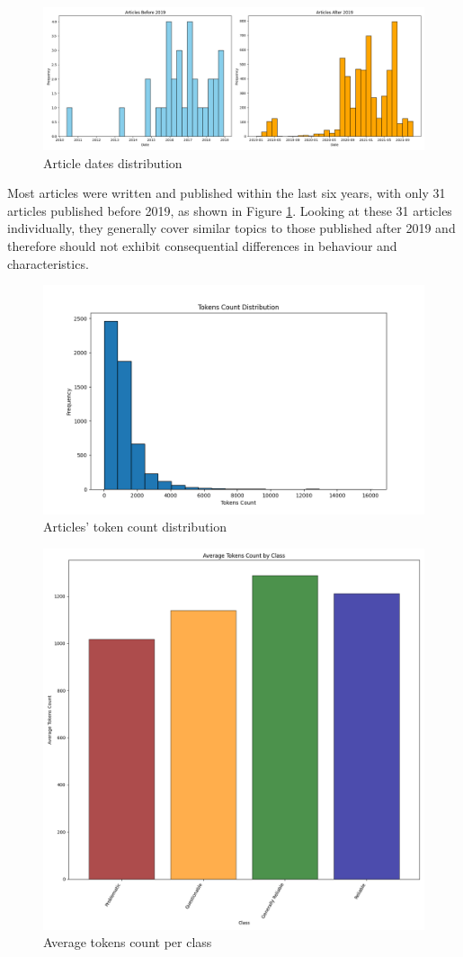 \begin{figure}[htbp]
    \includegraphics[width=0.9\linewidth]{figures/dates_hist.png}
    \caption{Article dates distribution}
    \label{fig:dates_hist}
\end{figure}

Most articles were written and published within the last six years, with only 31 articles published before 2019, as shown in Figure \ref{fig:dates_hist}. Looking at these 31 articles individually, they generally cover similar topics to those published after 2019 and therefore should not exhibit consequential differences in behaviour and characteristics.

\begin{figure}[htbp]
    \centering
    \includegraphics[width=0.9\linewidth]{figures/tokens_count_vx_hist.png}
    \caption{Articles' token count distribution}
    \label{fig:tokens_hist}
\end{figure}

\begin{figure}[htbp]
    \centering
    \includegraphics[width=0.6\linewidth]{figures/tokens_count_vx_per_class_hist.png}
    \caption{Average tokens count per class}
    \label{fig:avg_tokens_count_per_class}
\end{figure}

